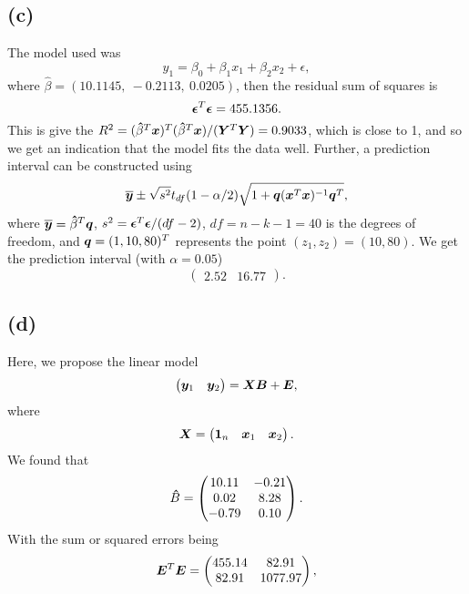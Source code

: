 \subsection*{(c)}
\label{sec:c-4}

The model used was
\begin{equation*}
  y_1 = \beta_0 + \beta_1 x_1 + \beta_2 x_2 + \epsilon,
\end{equation*}
where $\hat{\beta} = (10.1145,\   -0.2113,\    0.0205)$, then the
residual sum of squares is
\begin{equation*}
  \bm{\epsilon}^{T} \bm{\epsilon} = 455.1356.
\end{equation*}
This is give the $R^{2} = (\bm{\hat} \beta^{T} \bm{x})^{T} (\bm{\hat}
\beta^{T} \bm{x})/(\bm{Y}^{T} \bm{Y}) = 0.9033$, which is close to 1, and so
we get an indication that the model fits the data well. 
Further, a prediction interval can be constructed using
\begin{equation*}
  \overline{\bm{y}} \pm \sqrt{s^{2}}t_{df}(1 - \alpha/2)\sqrt{1 + \bm{q} (\bm{x}^{T} \bm{x})^{-1}\bm{q}^{T}},
\end{equation*}
where $\overline{\bm{y}} = \bm{\hat} \beta^{T} \bm{q}$, $s^{2} =\bm{\epsilon}^{T} \bm{\epsilon} / (df - 2) $, $df = n - k - 1
= 40$ is the degrees of freedom, and $\bm{q} = (1, 10, 80)^{T}$ represents
the point $(z_{1}, z_{2}) = (10, 80)$.  We get the prediction interval
(with $\alpha = 0.05$)
\begin{equation*}
  \begin{pmatrix}
    2.52 &16.77 
  \end{pmatrix}.
\end{equation*}

\subsection*{(d)}

Here, we propose the linear model
\begin{equation*}
  \begin{pmatrix}
    \bm{y}_1 & \bm{y}_2
  \end{pmatrix} = 
  \bm{X}\bm{B} + \bm{E},
\end{equation*}
where 
\begin{equation*}
 \bm{X} =
  \begin{pmatrix}
    \bm{1}_n & \bm{x}_1 & \bm{x}_2
  \end{pmatrix}.
\end{equation*}
We found that
\begin{equation*}
 \bm{\hat}  B =
  \begin{pmatrix}
    10.11 & -0.21 \\ 
    0.02 & 8.28 \\ 
    -0.79 & 0.10 
  \end{pmatrix}.
\end{equation*}
With the sum or squared errors being
\begin{equation*}
  \bm{E} ^{T} \bm{E} = 
  \begin{pmatrix}
    455.14 &82.91 \\ 
    82.91 &1077.97
  \end{pmatrix},
\end{equation*}

